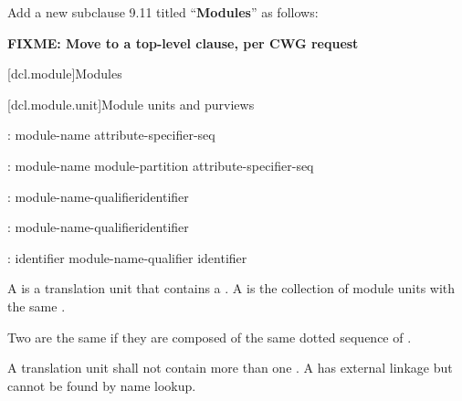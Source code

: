 \noindent
Add a new subclause 9.11 titled ``\textbf{Modules}'' as follows:

\textbf{\color{red}FIXME: Move to a top-level clause, per CWG request}

\setcounter{section}{10}
[dcl.module]{Modules}%

[dcl.module.unit]{Module units and purviews}

\begin{std.txt}\color{addclr}
\begin{before}\color{addclr}
\begin{bnf}
:\br
   \opt{}  module-name attribute-specifier-seq\opt{} \terminal{;}
\end{bnf}
\end{before}\begin{after}\color{addclr}
\begin{bnf}
:\br
   \opt{}  module-name module-partition\opt{} attribute-specifier-seq\opt{} \terminal{;}
\end{bnf}
\end{after}
  
  \begin{bnf}\color{addclr}
    :\br
      module-name-qualifier\opt identifier
  \end{bnf}
  
  \begin{after}
  \begin{bnf}\color{addclr}
    :\br
      \terminal{:} module-name-qualifier\opt identifier
  \end{bnf}
  \end{after}
  
  \begin{bnf}\color{addclr}
    :\br
      identifier \br
      module-name-qualifier identifier 
  \end{bnf}
  
  \resetalinea[0]
\alinea A  is a translation unit that contains
a . A  is the
collection of module units with the same .
\begin{after}\color{addclr}
Two  are the same if they are
composed of the same dotted sequence of .
\end{after}
\begin{before}\color{addclr}
A translation unit shall not contain more than
one .
A 
has external linkage but cannot be found by name lookup.
\end{before}


\end{std.txt}
